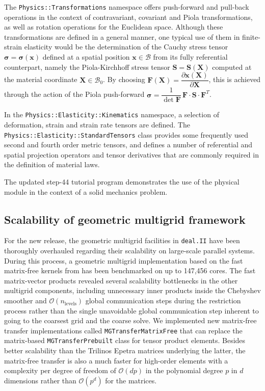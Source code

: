 \documentclass{ansarticle-preprint}
\newcommand{\specialword}[1]{\texttt{#1}}
\newcommand{\dealii}{{\specialword{deal.II}}}
\begin{document}
The \verb!Physics::Transformations! namespace offers push-forward and
pull-back operations in the context of contravariant, covariant and Piola
transformations, as well as rotation operations for the Euclidean space. 
Although these transformations are defined in a general manner, one typical
use of them in finite-strain elasticity would be the determination of the 
Cauchy stress tensor $\boldsymbol{\sigma} = \boldsymbol{\sigma}\left(\mathbf{x}\right)$ 
defined at a spatial position $\mathbf{x} \in \mathcal{B}$ from its
fully referential counterpart, namely the Piola-Kirchhoff stress tensor 
$\mathbf{S} = \mathbf{S}\left(\mathbf{X}\right)$ computed at the material 
coordinate $\mathbf{X} \in \mathcal{B}_{0}$.
By choosing
$\mathbf{F} \left(\mathbf{X}\right) = \dfrac{\partial \mathbf{x}\left(\mathbf{X}\right)}{\partial \mathbf{X}}$,
this is achieved through the action of the Piola push-forward
$\boldsymbol{\sigma} = \dfrac{1}{\det \mathbf{F}} \, \mathbf{F} \cdot \mathbf{S} \cdot \mathbf{F}^{T}$.

In the \verb!Physics::Elasticity::Kinematics! namespace, a selection of
deformation, strain and strain rate tensors are defined. The
\verb!Physics::Elasticity::StandardTensors! class provides some frequently
used second and fourth order metric tensors, and defines a number of
referential and spatial projection operators and tensor derivatives that
are commonly required in the definition of material laws.


The updated step-44 tutorial program demonstrates the
use of the physical module in the context of a solid mechanics problem.


\subsection{Scalability of geometric multigrid framework}

For the new release, the geometric multigrid facilities in \dealii{} have been
thoroughly overhauled regarding their scalability on large-scale parallel
systems. During this process, a geometric multigrid implementation based on
the fast matrix-free kernels from \cite{KronbichlerKormann2012} has been
benchmarked on up to 147,456 cores. The fast matrix-vector products revealed
several scalability bottlenecks in the other multigrid components, including
unnecessary inner products inside the Chebyshev smoother and
${\mathcal O}(n_\text{levels})$ global communication steps during the
restriction process rather than the single unavoidable global communication
step inherent to going to the coarsest grid and the coarse solve. We
implemented new
matrix-free transfer implementations called \texttt{MGTransferMatrixFree}
that can replace the matrix-based \texttt{MGTransferPrebuilt} class
for tensor product elements. Besides better scalability than the Trilinos
Epetra matrices underlying the latter, the matrix-free transfer is also a much
faster for high-order elements with a complexity per degree of freedom of
$\mathcal O(d p)$ in the polynomial degree $p$ in $d$ dimensions rather than
$\mathcal O(p^d)$ for the matrices.
\end{document}
